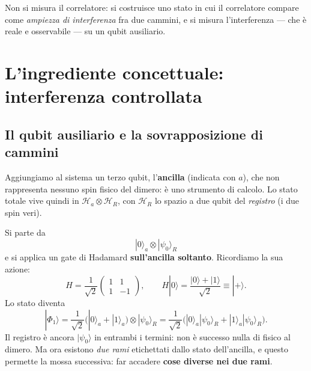 \documentclass[11pt,a4paper]{article}
\begin{document}
\begin{ideabox}
Non si misura il correlatore: si costruisce uno stato in cui il correlatore compare come
\emph{ampiezza di interferenza} fra due cammini, e si misura l'interferenza --- che è reale e
osservabile --- su un qubit ausiliario.
\end{ideabox}

\section{L'ingrediente concettuale: interferenza controllata}

\subsection{Il qubit ausiliario e la sovrapposizione di cammini}

Aggiungiamo al sistema un terzo qubit, l'\textbf{ancilla} (indicata con $a$), che non rappresenta
nessuno spin fisico del dimero: è uno strumento di calcolo. Lo stato totale vive quindi in
$\mathcal H_a\otimes\mathcal H_R$, con $\mathcal H_R$ lo spazio a due qubit del \emph{registro}
(i due spin veri).

Si parte da
\begin{equation}
|0\rangle_a\otimes|\psi_0\rangle_R
\end{equation}
e si applica un gate di Hadamard \textbf{sull'ancilla soltanto}. Ricordiamo la sua azione:
\begin{equation}
H=\frac{1}{\sqrt2}\begin{pmatrix}1&1\\1&-1\end{pmatrix},
\qquad H|0\rangle=\frac{|0\rangle+|1\rangle}{\sqrt2}\equiv|+\rangle .
\end{equation}
Lo stato diventa
\begin{equation}
|\Phi_1\rangle=\frac{1}{\sqrt2}\Big(|0\rangle_a+|1\rangle_a\Big)\otimes|\psi_0\rangle_R
=\frac{1}{\sqrt2}\Big(|0\rangle_a|\psi_0\rangle_R+|1\rangle_a|\psi_0\rangle_R\Big).
\end{equation}
Il registro è ancora $|\psi_0\rangle$ in entrambi i termini: non è successo nulla di fisico al
dimero. Ma ora esistono \emph{due rami} etichettati dallo stato dell'ancilla, e questo permette
la mossa successiva: far accadere \textbf{cose diverse nei due rami}.
\end{document}
